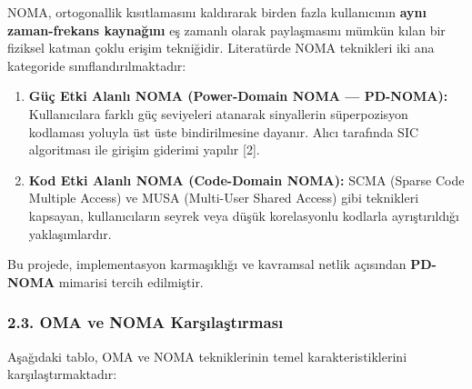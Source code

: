 \documentclass[
]{IEEEtran}
\begin{document}
NOMA, ortogonallik kısıtlamasını kaldırarak birden fazla kullanıcının
\textbf{aynı zaman-frekans kaynağını} eş zamanlı olarak paylaşmasını
mümkün kılan bir fiziksel katman çoklu erişim tekniğidir. Literatürde
NOMA teknikleri iki ana kategoride sınıflandırılmaktadır:

\begin{enumerate}
\def\labelenumi{\arabic{enumi}.}
\item
  \textbf{Güç Etki Alanlı NOMA (Power-Domain NOMA --- PD-NOMA):}
  Kullanıcılara farklı güç seviyeleri atanarak sinyallerin süperpozisyon
  kodlaması yoluyla üst üste bindirilmesine dayanır. Alıcı tarafında SIC
  algoritması ile girişim giderimi yapılır {[}2{]}.
\item
  \textbf{Kod Etki Alanlı NOMA (Code-Domain NOMA):} SCMA (Sparse Code
  Multiple Access) ve MUSA (Multi-User Shared Access) gibi teknikleri
  kapsayan, kullanıcıların seyrek veya düşük korelasyonlu kodlarla
  ayrıştırıldığı yaklaşımlardır.
\end{enumerate}

Bu projede, implementasyon karmaşıklığı ve kavramsal netlik açısından
\textbf{PD-NOMA} mimarisi tercih edilmiştir.

\subsubsection{2.3. OMA ve NOMA
Karşılaştırması}\label{oma-ve-noma-karux15fux131laux15ftux131rmasux131}

Aşağıdaki tablo, OMA ve NOMA tekniklerinin temel karakteristiklerini
karşılaştırmaktadır:
\end{document}
